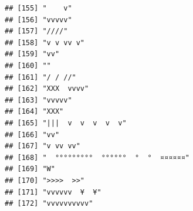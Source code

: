 \documentclass[
]{article}
\begin{document}
\begin{verbatim}
## [155] "    v"                                                                                                                                    
## [156] "vvvvv"                                                                                                                                    
## [157] "////"                                                                                                                                     
## [158] "v v vv v"                                                                                                                                 
## [159] "vv"                                                                                                                                       
## [160] ""                                                                                                                                         
## [161] "/ / //"                                                                                                                                   
## [162] "XXX  vvvv"                                                                                                                                
## [163] "vvvvv"                                                                                                                                    
## [164] "XXX"                                                                                                                                      
## [165] "|||  v  v  v  v  v"                                                                                                                       
## [166] "vv"                                                                                                                                       
## [167] "v vv vv"                                                                                                                                  
## [168] "  °°°°°°°°°  °°°°°°  °  °  ¤¤¤¤¤¤"                                                                                                        
## [169] "W"                                                                                                                                        
## [170] ">>>>  >>"                                                                                                                                 
## [171] "vvvvvv  ¥  ¥"                                                                                                                             
## [172] "vvvvvvvvvv"                                                                                                                               

\end{verbatim}
\end{document}
